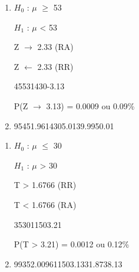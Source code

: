 \begin{question}
    
    \begin{enumerate}[label={\textbf{\alph*)}}]
        
        \item 
        
            $H_0$ : $\mu$ $\geq$ 53 

            $H_1$ : $\mu$ < 53 

            Z $\rightarrow$ 2.33 (RA)

            Z $\leftarrow$ 2.33 (RR)

            \begin{formula7}
                {45}{53}{14}{30}{-3.13}
            \end{formula7}

            P(Z $\rightarrow$ 3.13) = 0.0009 ou 0.09\%
        \item 

            \begin{formula1}
               {95}{45}{1.96}{14}{30}{5.01}{39.99}{50.01}
            \end{formula1}
            
    \end{enumerate}
\end{question}


\begin{question}
    
    \begin{enumerate}[label={\textbf{\alph*)}}]
        
        \item 
        
            $H_0$ : $\mu$ $\leq$ 30 

            $H_1$ : $\mu$ > 30 
        
            T > 1.6766 (RR)

            T < 1.6766 (RA)

            \begin{formula7}
                {35}{30}{11}{50}{3.21}
            \end{formula7}

            P(T > 3.21) = 0.0012 ou 0.12\%

        \item 
    
            \begin{formula2}
                {99}{35}{2.0096}{11}{50}{3.13}{31.87}{38.13}
            \end{formula2}

    \end{enumerate}
\end{question}

